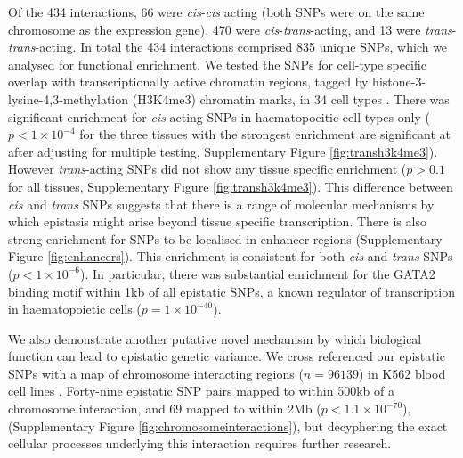 \documentclass{article}
\begin{document}
Of the 434 interactions, 66 were \emph{cis}-\emph{cis} acting (both SNPs were on the same chromosome as the expression gene), 470 were \emph{cis}-\emph{trans}-acting, and 13 were \emph{trans}-\emph{trans}-acting. In total the 434 interactions comprised 835 unique SNPs, which we analysed for functional enrichment. We tested the SNPs for cell-type specific overlap with transcriptionally active chromatin regions, tagged by histone-3-lysine-4,3-methylation (H3K4me3) chromatin marks, in 34 cell types \cite{Trynka2013}. There was significant enrichment for \emph{cis}-acting SNPs in haematopoeitic cell types only ($p < 1 \times 10^{-4}$ for the three tissues with the strongest enrichment are significant at after adjusting for multiple testing, Supplementary Figure \ref{fig:transh3k4me3}). However \emph{trans}-acting SNPs did not show any tissue specific enrichment ($p > 0.1$ for all tissues, Supplementary Figure \ref{fig:transh3k4me3}). This difference between \emph{cis} and \emph{trans} SNPs suggests that there is a range of molecular mechanisms by which epistasis might arise beyond tissue specific transcription. There is also strong enrichment for SNPs to be localised in enhancer regions \cite{Ward2012a} (Supplementary Figure \ref{fig:enhancers}). This enrichment is consistent for both \emph{cis} and \emph{trans} SNPs ($p < 1 \times 10^{-6}$). In particular, there was substantial enrichment for the GATA2 binding motif within 1kb of all epistatic SNPs, a known regulator of transcription in haematopoietic cells \cite{Tsai1994} ($p = 1 \times 10^{-40}$).

We also demonstrate another putative novel mechanism by which biological function can lead to epistatic genetic variance. We cross referenced our epistatic SNPs with a map of chromosome interacting regions ($n = 96139$) in K562 blood cell lines \cite{Lan2012}. Forty-nine epistatic SNP pairs mapped to within 500kb of a chromosome interaction, and 69 mapped to within 2Mb ($p < 1.1 \times 10^{-70}$), (Supplementary Figure \ref{fig:chromosomeinteractions}), but decyphering the exact cellular processes underlying this interaction requires further research.
\end{document}
